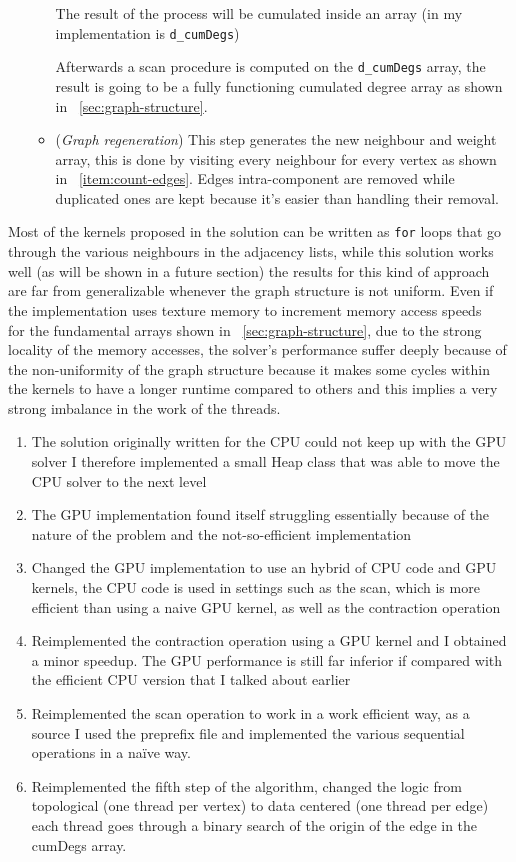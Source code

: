 \documentclass[a4paper,10pt]{article}
\begin{document}
\begin{enumerate}
\begin{itemize}
				The result of the process will be cumulated inside an array (in my
				implementation is \texttt{d\_cumDegs})

				Afterwards a scan procedure is computed on the \texttt{d\_cumDegs}
				array, the result is going to be a fully functioning cumulated
				degree array as shown in ~\ref{sec:graph-structure}.
			\item\label{item:graph-regen} (\textit{Graph regeneration}) This step
				generates the new neighbour and weight array, this is done by
				visiting every neighbour for every vertex as shown in
				~\ref{item:count-edges}. Edges intra-component are removed while
				duplicated ones are kept because it's easier than handling their removal.
		\end{itemize}
\end{enumerate}
Most of the kernels proposed in the solution can be written as \texttt{for} loops that go through
the various neighbours in the adjacency lists, while this solution works well (as will be shown in a
future section) the results for this kind of approach are far from generalizable whenever the graph
structure is not uniform. Even if the implementation uses texture memory to increment memory access
speeds ~\cite{gpu-programming-cuda} for the fundamental arrays shown in ~\ref{sec:graph-structure}, 
due to the strong locality of the memory accesses, the solver's performance suffer deeply because of 
the non-uniformity of the graph structure because it makes some cycles within the kernels to have a 
longer runtime compared to others and this implies a very strong imbalance in the work of the threads.



\begin{enumerate}
	\item The solution originally written for the CPU could not keep up with the GPU solver I therefore implemented a small Heap class that was able to move the CPU solver to the next level
	\item The GPU implementation found itself struggling essentially because of the nature of the problem and the not-so-efficient implementation
	\item Changed the GPU implementation to use an hybrid of CPU code and GPU kernels, the CPU code is used in settings such as the scan, which is more efficient than using a naive GPU kernel, as well as the contraction operation
	\item Reimplemented the contraction operation using a GPU kernel and I obtained a minor speedup. The GPU performance is still far inferior if compared with the efficient CPU version that I talked about earlier
	\item Reimplemented the scan operation to work in a work efficient way, as a source I used the preprefix file and implemented the various sequential operations in a naïve way.
	\item Reimplemented the fifth step of the algorithm, changed the logic from topological (one thread per vertex) to data centered (one thread per edge) each thread goes through a binary search of the origin of the edge in the cumDegs array.
\end{enumerate}
\end{document}
